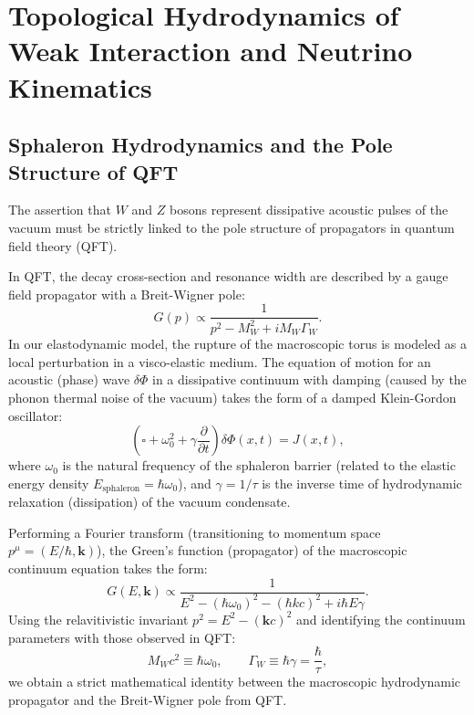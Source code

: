 \documentclass[11pt,a4paper]{article}
\begin{document}
\section{Topological Hydrodynamics of Weak Interaction and Neutrino Kinematics}
	
\subsection{Sphaleron Hydrodynamics and the Pole Structure of QFT}
The assertion that $W$ and $Z$ bosons represent dissipative acoustic pulses of the vacuum must be strictly linked to the pole structure of propagators in quantum field theory (QFT).

In QFT, the decay cross-section and resonance width are described by a gauge field propagator with a Breit-Wigner pole:
\begin{equation}
G(p) \propto \frac{1}{p^2 - M_W^2 + i M_W \Gamma_W}.
\end{equation}
In our elastodynamic model, the rupture of the macroscopic torus is modeled as a local perturbation in a visco-elastic medium. The equation of motion for an acoustic (phase) wave $\delta \Phi$ in a dissipative continuum with damping (caused by the phonon thermal noise of the vacuum) takes the form of a damped Klein-Gordon oscillator:
\begin{equation}
\left( \square + \omega_0^2 + \gamma \frac{\partial}{\partial t} \right) \delta \Phi(x,t) = J(x,t),
\end{equation}
where $\omega_0$ is the natural frequency of the sphaleron barrier (related to the elastic energy density $E_{\text{sphaleron}} = \hbar \omega_0$), and $\gamma = 1/\tau$ is the inverse time of hydrodynamic relaxation (dissipation) of the vacuum condensate.

Performing a Fourier transform (transitioning to momentum space $p^\mu = (E/\hbar, \mathbf{k})$), the Green's function (propagator) of the macroscopic continuum equation takes the form:
\begin{equation}
G(E, \mathbf{k}) \propto \frac{1}{E^2 - (\hbar\omega_0)^2 - (\hbar k c)^2 + i \hbar E \gamma}.
\end{equation}
Using the relavitivistic invariant $p^2 = E^2 - (\mathbf{k}c)^2$ and identifying the continuum parameters with those observed in QFT:
\begin{equation}
M_W c^2 \equiv \hbar \omega_0, \qquad \Gamma_W \equiv \hbar \gamma = \frac{\hbar}{\tau},
\end{equation}
we obtain a strict mathematical identity between the macroscopic hydrodynamic propagator and the Breit-Wigner pole from QFT.
\end{document}
